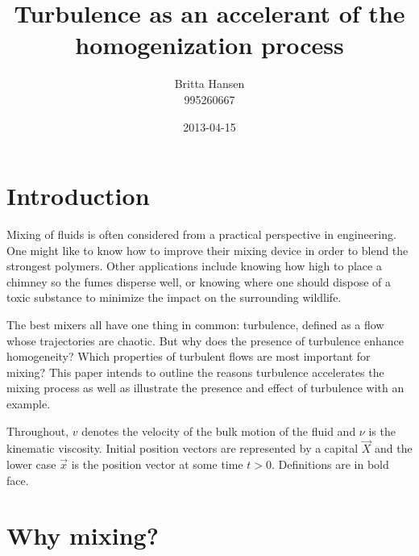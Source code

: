 \documentclass[a4paper,12pt]{article}
\begin{document}
\pagestyle{headings}
\title{Turbulence as an accelerant of the homogenization process}
\author{Britta Hansen\\995260667}
\date{2013-04-15}
\maketitle
{}
\tableofcontents
{}
\newcommand{\vecnorm}[1]{\left|\left|#1\right|\right|}
\section{Introduction}

Mixing of fluids is often considered from a practical perspective in engineering. One might like to know how to improve their mixing device in order to blend the strongest polymers. Other applications include knowing how high to place a chimney so the fumes disperse well, or knowing where one should dispose of a toxic substance to minimize the impact on the surrounding wildlife. \doublespacing

The best mixers all have one thing in common: turbulence, defined as a flow whose trajectories are chaotic. But why does the presence of turbulence enhance homogeneity? Which properties of turbulent flows are most important for mixing? This paper intends to outline the reasons turbulence accelerates the mixing process as well as illustrate the presence and effect of turbulence with an example. 

Throughout, $v$ denotes the velocity of the bulk motion of the fluid and $\nu$ is the kinematic viscosity. Initial position vectors are represented by a capital $\vec{X}$ and the lower case $\vec{x}$ is the position vector at some time $t > 0$. Definitions are in bold face.
\section{Why mixing?} 
\end{document}
